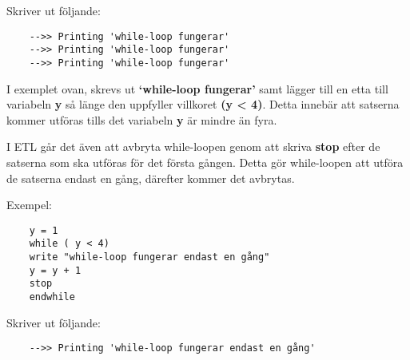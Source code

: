 \documentclass{TDP019mall}
\begin{document}
Skriver ut följande:
\begin{verbatim}
    -->> Printing 'while-loop fungerar'
    -->> Printing 'while-loop fungerar'
    -->> Printing 'while-loop fungerar'
\end{verbatim}
 
I exemplet ovan, skrevs ut \textbf{‘while-loop fungerar’} samt lägger till en etta till variabeln \textbf{y} så länge den 
uppfyller villkoret \textbf{(y < 4)}. Detta innebär att satserna kommer utföras tills det variabeln \textbf{y} är mindre än fyra. 
 
I ETL går det även att avbryta while-loopen genom att skriva \textbf{stop} efter de satserna som ska utföras för det första gången. 
Detta gör while-loopen att utföra de satserna endast en gång, därefter kommer det avbrytas.

Exempel: 
\begin{verbatim}
    y = 1
    while ( y < 4)
    write "while-loop fungerar endast en gång"
    y = y + 1
    stop
    endwhile
\end{verbatim}
 
Skriver ut följande:
\begin{verbatim}
    -->> Printing 'while-loop fungerar endast en gång'
\end{verbatim}
\end{document}
